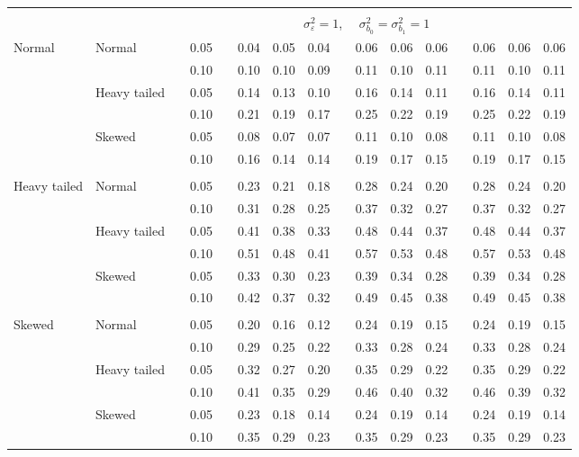 \documentclass[12pt]{article} %
\begin{document}
\begin{table}[ht]
\begin{scriptsize}
\begin{center}
\begin{tabular}{ll p{.1cm} c p{.1cm} rrr p{.1cm} rrr p{.1cm} rrr}
&&&&&&&&&&&&&&&\\
& && && \multicolumn{9}{c}{$\sigma_{\varepsilon}^2 = 1$, \ \ $\sigma_{b_0}^2 = \sigma_{b_1}^2 = 1$} \\ \cline{6-16}
\rowcolor{gray!20}Normal       & Normal       && 0.05 &&   0.04 & 0.05 & 0.04 && 0.06 & 0.06 & 0.06 && 0.06 & 0.06 & 0.06 \\ 
\rowcolor{gray!20}             &              && 0.10 &&   0.10 & 0.10 & 0.09 && 0.11 & 0.10 & 0.11 && 0.11 & 0.10 & 0.11 \\ 
\rowcolor{gray!20}             & Heavy tailed && 0.05 &&   0.14 & 0.13 & 0.10 && 0.16 & 0.14 & 0.11 && 0.16 & 0.14 & 0.11 \\ 
\rowcolor{gray!20}             &              && 0.10 &&   0.21 & 0.19 & 0.17 && 0.25 & 0.22 & 0.19 && 0.25 & 0.22 & 0.19 \\ 
\rowcolor{gray!20}             & Skewed       && 0.05 &&   0.08 & 0.07 & 0.07 && 0.11 & 0.10 & 0.08 && 0.11 & 0.10 & 0.08 \\ 
\rowcolor{gray!20}             &              && 0.10 &&   0.16 & 0.14 & 0.14 && 0.19 & 0.17 & 0.15 && 0.19 & 0.17 & 0.15 \\ 
             &&&&&&&&&&&&&&&\\
Heavy tailed & Normal       && 0.05 &&   0.23 & 0.21 & 0.18 && 0.28 & 0.24 & 0.20 && 0.28 & 0.24 & 0.20 \\ 
             &              && 0.10 &&   0.31 & 0.28 & 0.25 && 0.37 & 0.32 & 0.27 && 0.37 & 0.32 & 0.27 \\ 
             & Heavy tailed && 0.05 &&   0.41 & 0.38 & 0.33 && 0.48 & 0.44 & 0.37 && 0.48 & 0.44 & 0.37 \\ 
             &              && 0.10 &&   0.51 & 0.48 & 0.41 && 0.57 & 0.53 & 0.48 && 0.57 & 0.53 & 0.48 \\ 
             & Skewed       && 0.05 &&   0.33 & 0.30 & 0.23 && 0.39 & 0.34 & 0.28 && 0.39 & 0.34 & 0.28 \\ 
             &              && 0.10 &&   0.42 & 0.37 & 0.32 && 0.49 & 0.45 & 0.38 && 0.49 & 0.45 & 0.38 \\ 
             &&&&&&&&&&&&&&&\\
Skewed       & Normal       && 0.05 &&   0.20 & 0.16 & 0.12 && 0.24 & 0.19 & 0.15 && 0.24 & 0.19 & 0.15 \\ 
             &              && 0.10 &&   0.29 & 0.25 & 0.22 && 0.33 & 0.28 & 0.24 && 0.33 & 0.28 & 0.24 \\ 
             & Heavy tailed && 0.05 &&   0.32 & 0.27 & 0.20 && 0.35 & 0.29 & 0.22 && 0.35 & 0.29 & 0.22 \\ 
             &              && 0.10 &&   0.41 & 0.35 & 0.29 && 0.46 & 0.40 & 0.32 && 0.46 & 0.39 & 0.32 \\ 
             & Skewed       && 0.05 &&   0.23 & 0.18 & 0.14 && 0.24 & 0.19 & 0.14 && 0.24 & 0.19 & 0.14 \\ 
             &              && 0.10 &&   0.35 & 0.29 & 0.23 && 0.35 & 0.29 & 0.23 && 0.35 & 0.29 & 0.23 \\ 



\end{tabular}
\end{center}
\end{scriptsize}
\end{table}
\end{document}
